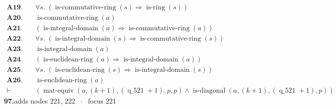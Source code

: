 \documentclass[11pt]{article}
\theoremstyle{plain}
\newcommand{\fit}[1]{\resizebox{\ifdim\width>\linewidth\linewidth\else\width\fi}{!}{#1}}
\begin{document}
\begin{align*}
  \mathbf{A19.}\quad & \forall s.\; (\operatorname{is\text{-}commutative\text{-}ring}(s) \Rightarrow \operatorname{is\text{-}ring}(s)) \\
  \mathbf{A20.}\quad & \operatorname{is\text{-}commutative\text{-}ring}(a) \\
  \mathbf{A21.}\quad & (\operatorname{is\text{-}integral\text{-}domain}(a) \Rightarrow \operatorname{is\text{-}commutative\text{-}ring}(a)) \\
  \mathbf{A22.}\quad & \forall s.\; (\operatorname{is\text{-}integral\text{-}domain}(s) \Rightarrow \operatorname{is\text{-}commutative\text{-}ring}(s)) \\
  \mathbf{A23.}\quad & \operatorname{is\text{-}integral\text{-}domain}(a) \\
  \mathbf{A24.}\quad & (\operatorname{is\text{-}euclidean\text{-}ring}(a) \Rightarrow \operatorname{is\text{-}integral\text{-}domain}(a)) \\
  \mathbf{A25.}\quad & \forall s.\; (\operatorname{is\text{-}euclidean\text{-}ring}(s) \Rightarrow \operatorname{is\text{-}integral\text{-}domain}(s)) \\
  \mathbf{A26.}\quad & \operatorname{is\text{-}euclidean\text{-}ring}(a) \\
  \vdash\quad & (\operatorname{mat\text{-}equiv}(a, (k + 1), (\operatorname{q\_521} + 1), p, p) \wedge \operatorname{is\text{-}diagonal}(a, (k + 1), (\operatorname{q\_521} + 1), p))
\end{align*}
\medskip\noindent\textbf{97.}\quad \fit{\texttt{(di)}}\hfill{\small adds nodes 221, 222 $\;\cdot\;$ focus 221}\\[2pt]
\end{document}
